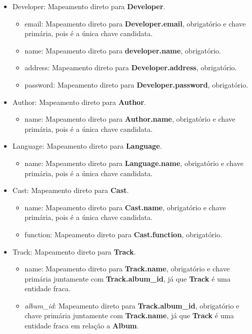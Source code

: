 \documentclass[a4paper, 11pt]{article}
\begin{document}
\begin{itemize}
\begin{itemize}
    \end{itemize}
    \item Developer: Mapeamento direto para {\textbf{Developer}}.
    \begin{itemize}
        \item email: Mapeamento direto para {\textbf{Developer.email}}, obrigatório e chave primária, pois é a única chave candidata.
        \item name: Mapeamento direto para {\textbf{developer.name}}, obrigatório.
        \item address: Mapeamento direto para {\textbf{Developer.address}}, obrigatório.
        \item password: Mapeamento direto para {\textbf{Developer.password}}, obrigatório.
    \end{itemize}
    \item Author: Mapeamento direto para {\textbf{Author}}.
    \begin{itemize}
        \item name: Mapeamento direto para {\textbf{Author.name}}, obrigatório e chave primária, pois é a única chave candidata.
    \end{itemize}
    \item Language: Mapeamento direto para {\textbf{Language}}.
    \begin{itemize}
        \item name: Mapeamento direto para {\textbf{Language.name}}, obrigatório e chave primária, pois é a única chave candidata.
    \end{itemize}
    \item Cast: Mapeamento direto para {\textbf{Cast}}.
    \begin{itemize}
        \item name: Mapeamento direto para {\textbf{Cast.name}}, obrigatório e chave primária, pois é a única chave candidata.
        \item function: Mapeamento direto para {\textbf{Cast.function}}, obrigatório.
    \end{itemize}
    \item Track: Mapeamento direto para {\textbf{Track}}.
    \begin{itemize}
        \item name: Mapeamento direto para {\textbf{Track.name}}, obrigatório e chave primária juntamente com \textbf{Track.album\_id}, já que \textbf{Track} é uma entidade fraca.
        \item \textit{album\_id}: Mapeamento direto para {\textbf{Track.album\_id}}, obrigatório e chave primária juntamente com \textbf{Track.name}, já que \textbf{Track} é uma entidade fraca em relação a \textbf{Album}.

\end{itemize}
\end{itemize}
\end{document}
